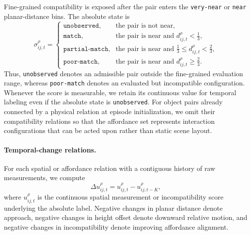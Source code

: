 Fine-grained compatibility is exposed after the pair enters the
\texttt{very-near} or \texttt{near} planar-distance bins. The absolute state is
\begin{equation}
\sigma_{ij,t}^{\rho}
=
\begin{cases}
\texttt{unobserved},
& \text{the pair is not near},\\
\texttt{match},
& \text{the pair is near and } d_{ij,t}^{\rho}<\frac{1}{3},\\
\texttt{partial-match},
& \text{the pair is near and }
  \frac{1}{3}\le d_{ij,t}^{\rho}<\frac{2}{3},\\
\texttt{poor-match},
& \text{the pair is near and } d_{ij,t}^{\rho}\ge\frac{2}{3}.
\end{cases}
\label{eq:affordance_bins}
\end{equation}
Thus, \texttt{unobserved} denotes an admissible pair outside the fine-grained
evaluation range, whereas \texttt{poor-match} denotes an evaluated but
incompatible configuration. Whenever the score is measurable, we retain its
continuous value for temporal labeling even if the absolute state is
\texttt{unobserved}. For object pairs already connected by a physical relation
at episode initialization, we omit their compatibility relations so
that the affordance set represents interaction configurations that can be
acted upon rather than static scene layout.

\paragraph{Temporal-change relations.}
For each spatial or affordance relation with a contiguous history of raw
measurements, we compute
\begin{equation}
\Delta u_{ij,t}^{\rho}
=
u_{ij,t}^{\rho}-u_{ij,t-K}^{\rho},
\label{eq:temporal_difference}
\end{equation}
where \(u_{ij,t}^{\rho}\) is the continuous spatial measurement or
incompatibility score underlying the absolute label. Negative changes in
planar distance denote approach, negative changes in height offset denote
downward relative motion, and negative changes in incompatibility denote
improving affordance alignment.

